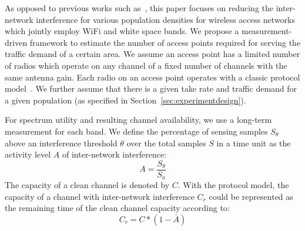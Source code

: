 As opposed to previous works such as~\cite{tang2005interference,yuan2006cross
,si2010overview}, this paper focuses on reducing the inter-network
interference for various population densities for wireless access networks which
jointly employ WiFi and white space bands. We propose a measurement-driven 
framework to estimate the number of access points required for serving the traffic
demand of a certain area. We assume an access point has a limited number of radios
which operate on any channel of a fixed number of channels with the same antenna gain.
Each radio on an access point operates with a classic protocol model~\cite{gupta2000capacity}. 
We further assume that there is a given take rate and traffic demand for a given 
population (as specified in Section~\ref{sec:experimentdesign}).  

For spectrum utility and resulting channel availability, we use a long-term measurement 
for each band.  We define the percentage of sensing samples $S_\theta$ above an 
interference threshold $\theta$ over the total samples $S$ in a time unit as the 
activity level $A$ of inter-network interference:
\begin{equation}
\label{eq:actdef}
A=\frac{S_\theta}{S_a}
\end{equation}
The capacity of a clean channel is denoted by $C$. With the protocol model, the capacity 
of a channel with inter-network interference $C_r$ could be represented as 
the remaining time of the clean channel capacity according to: 
\begin{equation}
\label{eq:intercap}
C_r=C*(1-\bar{A})
\end{equation}

